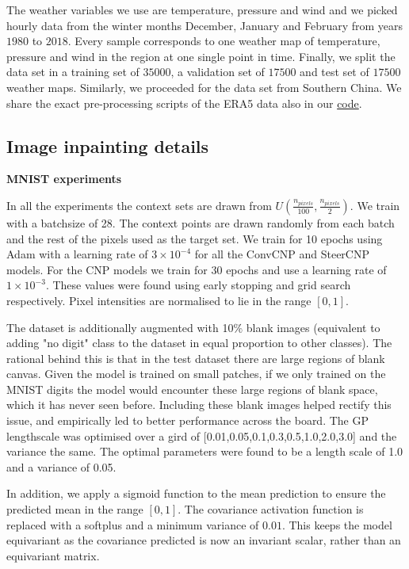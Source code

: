 The weather variables we use are temperature, pressure and wind and we picked hourly data from the winter months December, January and February from years $1980$ to $2018$.
Every sample corresponds to one weather map of temperature, pressure and wind in the region at one single point in time.
Finally, we split the data set in a training set of $35 000$, a validation set of $17 500$ and test set of $17 500$ weather maps.
Similarly, we proceeded for the data set from Southern China.
We share the exact pre-processing scripts of the ERA5 data also in our \href{https://github.com/PeterHolderrieth/Steerable_CNPs}{code}.

\subsection{Image inpainting details}
\label{sec:image_details}

\textbf{MNIST experiments}

In all the experiments the context sets are drawn from $U(\frac{n_{pixels}}{100}, \frac{n_{pixels}}{2})$.
We train with a batchsize of 28.
The context points are drawn randomly from each batch and the rest of the pixels used as the target set.
We train for 10 epochs using Adam \parencite{Adam} with a learning rate of $3\times 10^{-4}$ for all the ConvCNP and SteerCNP models.
For the CNP models we train for 30 epochs and use a learning rate of $1\times 10^{-3}$.
These values were found using early stopping and grid search respectively.
Pixel intensities are normalised to lie in the range $[0,1]$.

The dataset is additionally augmented with 10$\%$ blank images (equivalent to adding "no digit" class to the dataset in equal proportion to other classes).
The rational behind this is that in the test dataset there are large regions of blank canvas.
Given the model is trained on small patches, if we only trained on the MNIST digits the model would encounter these large regions of blank space, which it has never seen before.
Including these blank images helped rectify this issue, and empirically led to better performance across the board.
The GP lengthscale was optimised over a gird of [0.01,0.05,0.1,0.3,0.5,1.0,2.0,3.0] and the variance the same.
The optimal parameters were found to be a length scale of 1.0 and a variance of 0.05.

In addition, we apply a sigmoid function to the mean prediction to ensure the predicted mean in the range $[0,1]$.
The covariance activation function is replaced with a softplus and a minimum variance of $0.01$.
This keeps the model equivariant as the covariance predicted is now an invariant scalar, rather than an equivariant matrix.

